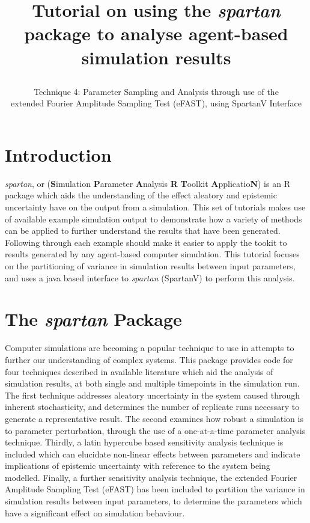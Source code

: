 \documentclass[a4paper,11pt]{article}
\title{\huge \textbf{Tutorial on using the \textit{spartan} package to analyse agent-based simulation results}\\
\author{\Large Technique 4: Parameter Sampling and Analysis through use of the \\ 
		\Large extended Fourier Amplitude Sampling Test (eFAST), using SpartanV Interface}
\date{}
}
\begin{document}
\maketitle

\section{Introduction}
\noindent \textit{spartan}, or (\textbf{S}imulation \textbf{P}arameter \textbf{A}nalysis \textbf{R} \textbf{T}oolkit \textbf{A}pplicatio\textbf{N}) is an R package which aids the understanding of the effect aleatory and epistemic uncertainty have on the output from a simulation. This set of tutorials makes use of available example simulation output to demonstrate how a variety of methods can be applied to further understand the results that have been generated.  Following through each example should make it easier to apply the tookit to results generated by any agent-based computer simulation.  This tutorial focuses on the partitioning of variance in simulation results between input parameters, and uses a java based interface to \textit{spartan} (SpartanV) to perform this analysis.

\section{The \textit{spartan} Package}
\noindent Computer simulations are becoming a popular technique to use in attempts to further our understanding of complex systems. This package provides code for four techniques described in available literature which aid the analysis of simulation results, at both single and multiple timepoints in the simulation run. The first technique addresses aleatory uncertainty in the system caused through inherent stochasticity, and determines the number of replicate runs necessary to generate a representative result. The second examines how robust a simulation is to parameter perturbation, through the use of a one-at-a-time parameter analysis technique. Thirdly, a latin hypercube based sensitivity analysis technique is included which can elucidate non-linear effects between parameters and indicate implications of epistemic uncertainty with reference to the system being modelled. Finally, a further sensitivity analysis technique, the extended Fourier Amplitude Sampling Test (eFAST) has been included to partition the variance in simulation results between input parameters, to determine the parameters which have a significant effect on simulation behaviour.
\end{document}
